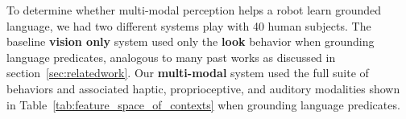 To determine whether multi-modal perception helps a robot learn grounded
language, we had two different systems play \ispy with 40 human subjects.  The
baseline \textbf{vision only} system used only the \textbf{look} behavior when
grounding language predicates, analogous to many past works as discussed in
section~\ref{sec:relatedwork}.  Our \textbf{multi-modal} system used the full
suite of behaviors and associated haptic, proprioceptive, and auditory
modalities shown in Table~\ref{tab:feature_space_of_contexts} when grounding
language predicates.
